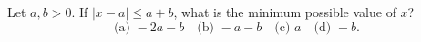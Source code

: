 Let $a,b>0$. If $|x-a|\le a+b$, what is the minimum possible value of $x$?\[\text{(a) }-2a-b\quad\text{(b) }-a-b\quad\text{(c) }a\quad\text{(d) }-b.\]
